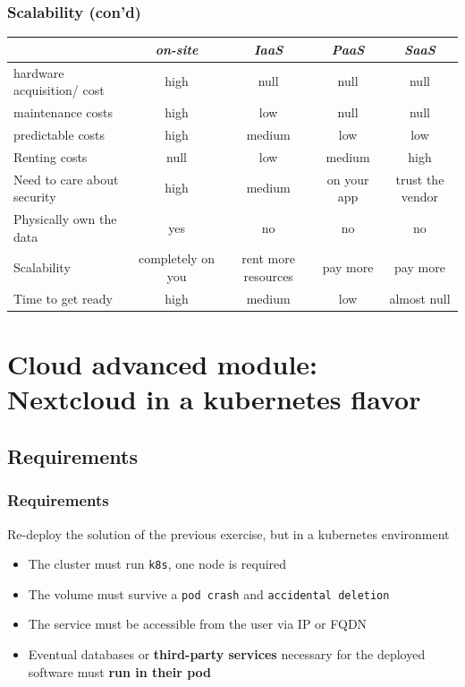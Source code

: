 \documentclass{beamer}
\let\oldtexttt\texttt
\renewcommand{\texttt}[1]{\textcolor{textttcolor}{\oldtexttt{#1}}}
\begin{document}
\begin{frame}
    \frametitle{Scalability (con'd)}
    \begin{center}
        \tiny
        \begin{tabular}{l|c c c c}
                                        & \textit{on-site} & \textit{IaaS} & \textit{PaaS} & \textit{SaaS} \\
            \hline
            hardware acquisition/ cost  & high              & null      & null          & null                  \\
            maintenance costs           & high              & low       & null          & null                  \\
            predictable costs           & high              & medium    & low           & low                   \\ 
            Renting costs               & null              & low       & medium        & high                  \\
            Need to care about security & high              & medium    & on your app   & trust the vendor      \\
            Physically own the data     & yes               & no        & no            & no                    \\
            Scalability                 & completely on you & rent more resources & pay more & pay more         \\
            Time to get ready           & high              & medium    & low           & almost null           \\
        \end{tabular}
    \end{center}
\end{frame}



\section{Cloud \textbf{advanced} module:\\ Nextcloud in a kubernetes flavor}

\subsection{Requirements}
\begin{frame}
    \frametitle{Requirements}
    Re-deploy the solution of the previous exercise, but in a kubernetes environment
    \begin{itemize}
        \item The cluster must run \texttt{k8s}, one node is required
        \item The volume must survive a \texttt{pod crash} and \texttt{accidental deletion}
        \item The service must be accessible from the user via IP or FQDN
        \item Eventual databases or \textbf{third-party services} necessary for the deployed software must \textbf{run in their pod}
    \end{itemize}
\end{frame}
\end{document}
